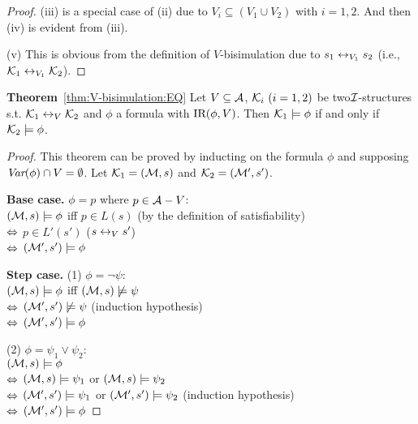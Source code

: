 \documentclass[twoside,11pt]{article}
\begin{document}
\begin{proof}
		(iii) is a special case of (ii) due to $V_i \subseteq (V_1 \cup V_2)$ with $i = 1, 2$. And then (iv) is evident from (iii).
		
		(v) This is obvious from the definition of $V$-bisimulation due to $s_1 \leftrightarrow_{V_1} s_2$ (i.e., ${\cal K}_1\leftrightarrow_{V_1}{\cal K}_2$).
		
	\end{proof}
	
	
	
	
	
	
	\noindent\textbf{Theorem}~\ref{thm:V-bisimulation:EQ}
	Let $V\subseteq\cal A$, ${\cal K}_i~(i=1,2)$ be two${\cal I}$-structures s.t.
	${\cal K}_1\leftrightarrow_V{\cal K}_2$ and $\phi$ a formula with $\textrm{IR}(\phi,V)$. Then
	${\cal K}_1\models\phi$ if and only if ${\cal K}_2\models\phi$.
	\\
	\begin{proof}
		This theorem can be proved by inducting on the formula $\phi$ and supposing $\textit{Var}(\phi) \cap V = \emptyset$.
		Let ${\cal K}_1 = ({\cal M}, s)$ and ${\cal K}_2 = ({\cal M}', s')$.
		
		
		\textbf{Base case.} $\phi = p$ where $p \in {\cal A} - V$:\\
		$({\cal M}, s) \models \phi$ iff $p\in L(s)$  \hfill  (by the definition of satisfiability) \\
		$\Leftrightarrow$ $p \in L'(s')$ \hfill ($s \leftrightarrow_V s'$)\\
		$\Leftrightarrow$ $({\cal M}', s') \models \phi$
		
		\textbf{Step case.} (1) $\phi = \neg \psi$:\\
		$({\cal M}, s) \models \phi$ iff $({\cal M}, s) \not \models \psi$ \\
		$\Leftrightarrow$ $({\cal M}', s') \not \models \psi$  \hfill   (induction hypothesis)\\
		$\Leftrightarrow$ $({\cal M}', s') \models \phi$
		
		(2) $\phi = \psi_1 \vee \psi_2$:\\
		$({\cal M}, s) \models \phi$\\
		$\Leftrightarrow$ $({\cal M}, s) \models \psi_1$ or $({\cal M}, s) \models \psi_2$\\
		$\Leftrightarrow$ $({\cal M}', s') \models \psi_1$ or $({\cal M}', s') \models \psi_2$   \hfill  (induction hypothesis)\\
		$\Leftrightarrow$ $({\cal M}', s') \models \phi$
		

\end{proof}
\end{document}
